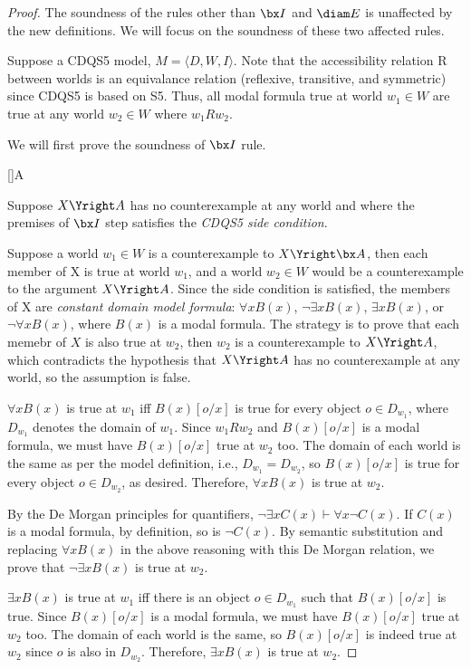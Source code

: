 \begin{proof}
The soundness of the rules other than $\bx I$ and $\diam E$ is unaffected by the new definitions. We will focus on the soundness of these two affected rules.

Suppose a CDQS5 model, $M = \langle D, W, I \rangle$. Note that the accessibility relation R between worlds is an equivalance relation (reflexive, transitive, and symmetric) since CDQS5 is based on S5. Thus, all modal formula true at world $w_1 \in W$ are true at any world $w_2 \in W$ where $w_1 R w_2$.

We will first prove the soundness of $\bx I$ rule.
\begin{prooftree*}
[\boxi]{\bx A}
\end{prooftree*}
Suppose $X \Yright A$ has no counterexample at any world and where the premises of $\bx I$ step satisfies the \textit{CDQS5 side condition}.

Suppose a world $w_1 \in W$ is a counterexample to $X \Yright \bx A$, then each member of X is true at world $w_1$, and a world $w_2 \in W$ would be a counterexample to the argument $X \Yright A$. Since the side condition is satisfied, the members of X are \textit{constant domain model formula}: $\forall x B(x)$, $\neg \exists x B(x)$, $\exists x B(x)$, or $\neg \forall x B(x)$, where $B(x)$ is a modal formula. The strategy is to prove that each memebr of $X$ is also true at $w_2$, then $w_2$ is a counterexample to $X \Yright A$, which contradicts the hypothesis that $X \Yright A$ has no counterexample at any world, so the assumption is false.

$\forall x B(x)$ is true at $w_1$ iff $B(x)[o/x]$ is true for every object $o \in D_{w_1}$, where $D_{w_1}$ denotes the domain of $w_1$. Since $w_1 R w_2$ and $B(x)[o/x]$ is a modal formula, we must have $B(x)[o/x]$ true at $w_2$ too. The domain of each world is the same as per the model definition, i.e., $D_{w_1} = D_{w_2}$, so $B(x)[o/x]$ is true for every object $o \in D_{w_2}$, as desired. Therefore, $\forall x B(x)$ is true at $w_2$.

By the De Morgan principles for quantifiers, $\neg \exists x C(x) \vdash \forall x \neg C(x)$. If $C(x)$ is a modal formula, by definition, so is $\neg C(x)$. By semantic substitution and replacing $\forall x B(x)$ in the above reasoning with this De Morgan relation, we prove that $\neg \exists x B(x)$ is true at $w_2$.

$\exists x B(x)$ is true at $w_1$ iff there is an object $o \in D_{w_1}$ such that $B(x)[o/x]$ is true. Since $B(x)[o/x]$ is a modal formula, we must have $B(x)[o/x]$ true at $w_2$ too. The domain of each world is the same, so $B(x)[o/x]$ is indeed true at $w_2$ since $o$ is also in $D_{w_2}$. Therefore, $\exists x B(x)$ is true at $w_2$.


\end{proof}
